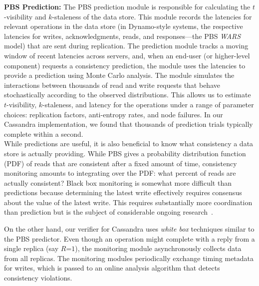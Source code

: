 \noindent\textbf{PBS Prediction:} The PBS prediction module is
responsible for calculating the $t$-visibility and $k$-staleness of
the data store. This module records the latencies for relevant
operations in the data store (in Dynamo-style systems, the respective
latencies for writes, acknowledgments, reads, and responses---the PBS
\textit{WARS} model) that are sent during replication.  The prediction
module tracks a moving window of recent latencies across servers, and,
when an end-user (or higher-level component) requests a consistency
prediction, the module uses the latencies to provide a prediction
using Monte Carlo analysis. The module simulates the interactions
between thousands of read and write requests that behave
stochastically according to the observed distributions. This allows us
to estimate $t$-visibility, $k$-staleness, and latency for the
operations under a range of parameter choices: replication factors,
anti-entropy rates, and node failures. In our Cassandra
implementation, we found that thousands of prediction trials typically
complete within a second.\\

 While predictions are useful, it is
also beneficial to know what consistency a data store is actually providing.
While PBS gives a probability distribution function (PDF) of reads that are
consistent after a fixed amount of time, consistency monitoring amounts to
integrating over the PDF: what percent of reads are actually consistent?
Black box monitoring is somewhat more difficult than predictions because
determining the latest write effectively requires consensus about the value of
the latest write. This requires substantially more coordination than prediction
but is the subject of considerable ongoing research~\cite{hotdep}. 

On the other hand, our verifier for Cassandra uses \textit{white box}
techniques similar to the PBS predictor. Even though an operation
might complete with a reply from a single replica (say $R$=$1$), the
monitoring module asynchronously collects data from all replicas. The
monitoring modules periodically exchange timing metadata for writes,
which is passed to an online analysis algorithm that detects
consistency violations.

